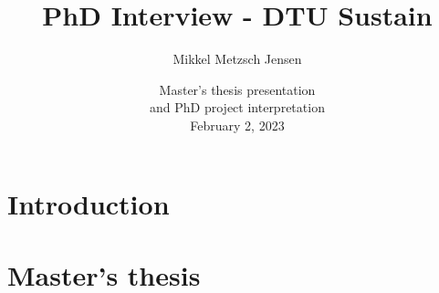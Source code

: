 \documentclass[
	10pt, %
]{beamer}
\title[PhD Interview - DTU Sustain]{PhD Interview - DTU Sustain} %
\author[Mikkel Metzsch Jensen]{Mikkel Metzsch Jensen} %
\institute[UiO]{University of Oslo} %
\date[February 2, 2023]{
Master's thesis presentation \\ 
and PhD project interpretation \\
\vspace*{5px} {\small February 2, 2023}}
\begin{document}

\begin{frame}
	\titlepage %
\end{frame}



	



\section{Introduction}


\section{Master's thesis}
\end{document}
